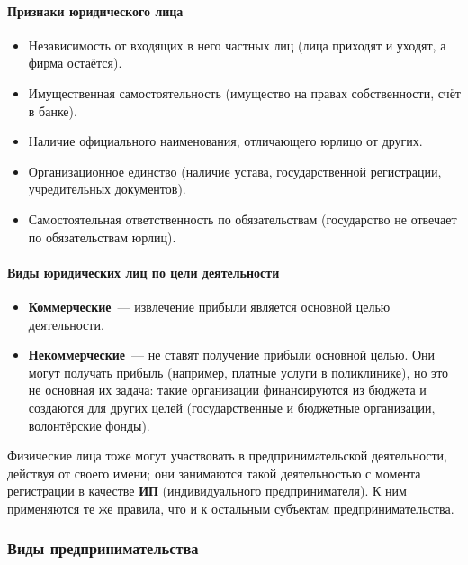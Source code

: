 \documentclass[12pt]{article}
\begin{document}
    \paragraph{Признаки юридического лица}
    \begin{itemize}
    	\item Независимость от входящих в него частных лиц (лица приходят и уходят, а фирма остаётся).
    	\item Имущественная самостоятельность (имущество на правах собственности, счёт в банке).
    	\item Наличие официального наименования, отличающего юрлицо от других.
    	\item Организационное единство (наличие устава, государственной регистрации, учредительных документов).
    	\item Самостоятельная ответственность по обязательствам (государство не отвечает по обязательствам юрлиц).
    \end{itemize}
    
    \paragraph{Виды юридических лиц по цели деятельности}
    \begin{itemize}
    	\item \textbf{Коммерческие}~--- извлечение прибыли является основной целью деятельности.
    	\item \textbf{Некоммерческие}~--- не ставят получение прибыли основной целью. Они могут получать прибыль (например, платные услуги в поликлинике), но это не основная их задача: такие организации финансируются из бюджета и создаются для других целей (государственные и бюджетные организации, волонтёрские фонды).
    \end{itemize}
    
    \begin{note}
    	Физические лица тоже могут участвовать в предпринимательской деятельности, действуя от своего имени; они занимаются такой деятельностью с момента регистрации в качестве \textbf{ИП} (индивидуального предпринимателя). К ним применяются те же правила, что и к остальным субъектам предпринимательства.
    \end{note}
    
    \subsubsection{Виды предпринимательства}
    
\end{document}
